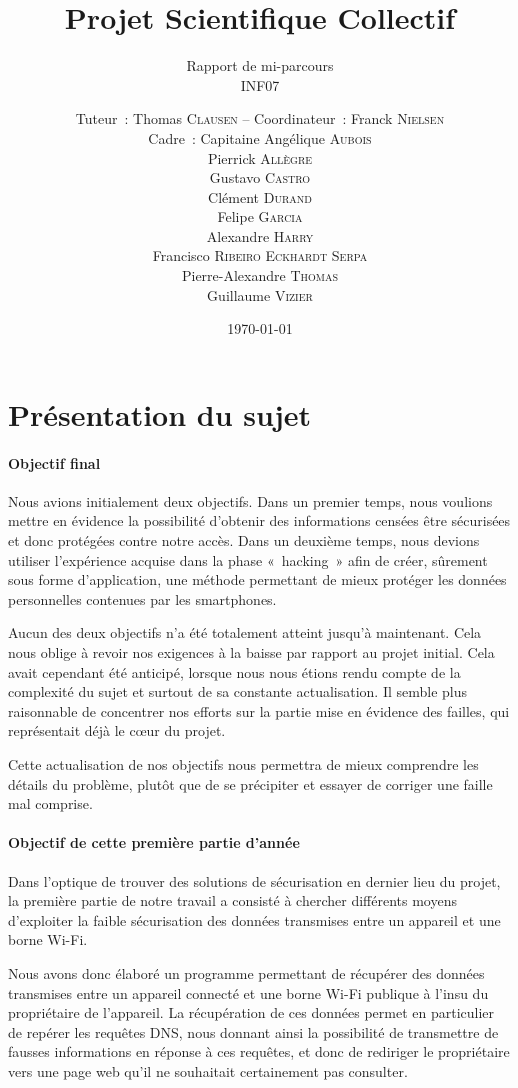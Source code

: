 \documentclass[a4paper, 12pt,twoside]{article}
\title{Projet Scientifique Collectif}
\subtitle{Rapport de mi-parcours \\ INF07}
\author{Tuteur~: Thomas \textsc{Clausen} -- Coordinateur~: Franck \textsc{Nielsen} \\
        Cadre~: Capitaine Angélique \textsc{Aubois} \\
        Pierrick \textsc{Allègre} \\
        Gustavo \textsc{Castro} \\
        Clément \textsc{Durand} \\
        Felipe \textsc{Garcia} \\
        Alexandre \textsc{Harry} \\
        Francisco \textsc{Ribeiro Eckhardt Serpa} \\
        Pierre-Alexandre \textsc{Thomas} \\
        Guillaume \textsc{Vizier} \\}
\date\today
\begin{document}
    \maketitle
    \renewcommand{\baselinestretch}{1.1}
    \setlength{\parskip}{0.5em}
    \tableofcontents
    \clearpage

    \section*{Présentation du sujet}

        \paragraph{Objectif final} Nous avions initialement deux objectifs. Dans un premier temps, nous voulions mettre en évidence la possibilité d'obtenir des informations censées être sécurisées et donc protégées contre notre accès. Dans un deuxième temps, nous devions utiliser l'expérience acquise dans la phase «~hacking~» afin de créer, sûrement sous forme d'application, une méthode permettant de mieux protéger les données personnelles contenues par les smartphones.

        Aucun des deux objectifs n'a été totalement atteint jusqu'à maintenant. Cela nous oblige à revoir nos exigences à la baisse par rapport au projet initial. Cela avait cependant été anticipé, lorsque nous nous étions rendu compte de la complexité du sujet et surtout de sa constante actualisation. Il semble plus raisonnable de concentrer nos efforts sur la partie mise en évidence des failles, qui représentait déjà le c\oe{}ur du projet.

        Cette actualisation de nos objectifs nous permettra de mieux comprendre les détails du problème, plutôt que de se précipiter et essayer de corriger une faille mal comprise.

        \paragraph{Objectif de cette première partie d'année}

        Dans l'optique de trouver des solutions de sécurisation en dernier lieu du projet, la première partie de notre travail a consisté à chercher différents moyens d'exploiter la faible sécurisation des données transmises entre un appareil et une borne Wi-Fi.

        Nous avons donc élaboré un programme permettant de récupérer des données transmises entre un appareil connecté et une borne Wi-Fi publique à l'insu du propriétaire de l'appareil. La récupération de ces données permet en particulier de repérer les requêtes DNS, nous donnant ainsi la possibilité de transmettre de fausses informations en réponse à ces requêtes, et donc de rediriger le propriétaire vers une page web qu'il ne souhaitait certainement pas consulter.
\end{document}
